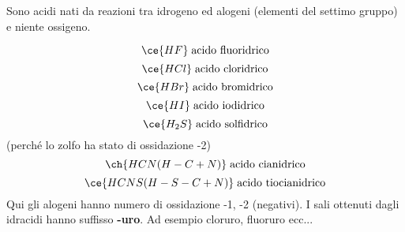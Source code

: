 Sono acidi nati da reazioni tra idrogeno ed alogeni (elementi del settimo gruppo) e niente ossigeno.

$$\ce{HF} \; \text{acido fluoridrico}$$
$$\ce{HCl} \; \text{acido cloridrico}$$
$$\ce{HBr} \; \text{acido bromidrico}$$
$$\ce{HI} \; \text{acido iodidrico}$$
$$\ce{H_2S} \; \text{acido solfidrico}$$
\hspace{+4cm}(perché lo zolfo ha stato di ossidazione -2)
$$\ch{HCN (H-C+N)} \; \text{acido cianidrico}$$
$$\ce{HCNS (H-S-C+N)} \; \text{acido tiocianidrico}$$
Qui gli alogeni hanno numero di ossidazione -1, -2 (negativi). I sali ottenuti dagli idracidi hanno suffisso \textbf{-uro}. Ad esempio cloruro, fluoruro ecc...


